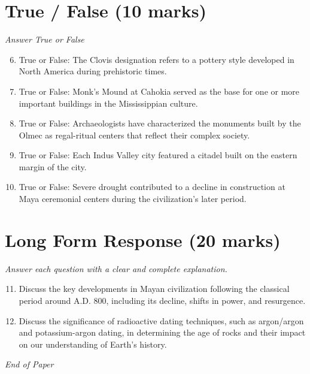 \documentclass[12pt]{article}
\begin{document}
\section*{True / False (10 marks)}
\textit{Answer True or False}
\begin{enumerate}[label=\arabic*.]
\setcounter{enumi}{5}
\item True or False: The Clovis designation refers to a pottery style developed in North America during prehistoric times.
\item True or False: Monk's Mound at Cahokia served as the base for one or more important buildings in the Mississippian culture.
\item True or False: Archaeologists have characterized the monuments built by the Olmec as regal-ritual centers that reflect their complex society.
\item True or False: Each Indus Valley city featured a citadel built on the eastern margin of the city.
\item True or False: Severe drought contributed to a decline in construction at Maya ceremonial centers during the civilization's later period.
\end{enumerate}

\section*{Long Form Response (20 marks)}
\textit{Answer each question with a clear and complete explanation.}
\begin{enumerate}[label=\arabic*.]
\setcounter{enumi}{10}
\item Discuss the key developments in Mayan civilization following the classical period around A.D. 800, including its decline, shifts in power, and resurgence.
\item Discuss the significance of radioactive dating techniques, such as argon/argon and potassium-argon dating, in determining the age of rocks and their impact on our understanding of Earth's history.
\end{enumerate}

\vfill
\noindent\textit{End of Paper}
\end{document}
